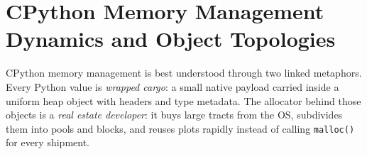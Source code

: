 \section{CPython Memory Management Dynamics and Object Topologies}

CPython memory management is best understood through two linked metaphors. Every Python value is \emph{wrapped cargo}: a small native payload carried inside a uniform heap object with headers and type metadata. The allocator behind those objects is a \emph{real estate developer}: it buys large tracts from the OS, subdivides them into pools and blocks, and reuses plots rapidly instead of calling \texttt{malloc()} for every shipment.
